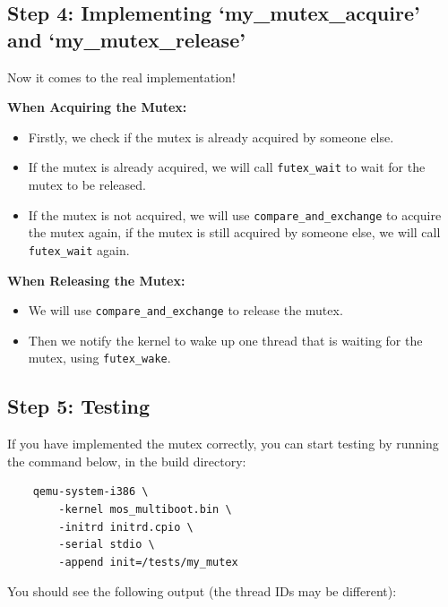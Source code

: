 \subsection{Step 4: Implementing `my\_mutex\_acquire' and `my\_mutex\_release'}

Now it comes to the real implementation!

\textbf{When Acquiring the Mutex:}

\begin{itemize}
    \item Firstly, we check if the mutex is already acquired by someone else.
    \item If the mutex is already acquired, we will call \texttt{futex\_wait} to
          wait for the mutex to be released.
    \item If the mutex is not acquired, we will use \texttt{compare\_and\_exchange}
          to acquire the mutex again, if the mutex is still acquired by someone
          else, we will call \texttt{futex\_wait} again.
\end{itemize}

\textbf{When Releasing the Mutex:}

\begin{itemize}
    \item We will use \texttt{compare\_and\_exchange} to release the mutex.
    \item Then we notify the kernel to wake up one thread that is waiting for the
          mutex, using \texttt{futex\_wake}.
\end{itemize}

\subsection{Step 5: Testing}

If you have implemented the mutex correctly, you can start testing by running the command
below, in the build directory:

\begin{verbatim}
    qemu-system-i386 \
        -kernel mos_multiboot.bin \
        -initrd initrd.cpio \
        -serial stdio \
        -append init=/tests/my_mutex
\end{verbatim}

You should see the following output (the thread IDs may be different):


